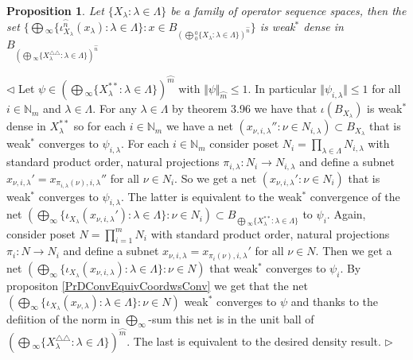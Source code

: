 \documentclass[12pt]{article}
\newtheorem{proposition}[theorem]{Proposition}
\newenvironment{proof}{\par $\triangleleft$}{$\triangleright$}
\begin{document}
\begin{proposition}\label{PrDensSubsetOfSumOfDoubleDuals} Let $\{X_\lambda:\lambda\in\Lambda\}$ be a family of operator sequence spaces, then the set $\{\bigoplus{}_\infty\{\iota_{X_\lambda}^{\wideparen{n}}(x_\lambda):\lambda\in \Lambda\}:x\in B_{(\bigoplus{}_0^0\{X_\lambda:\lambda\in \Lambda\})^{\wideparen{n}}}\}$ is weak${}^*$ dense in $B_{(\bigoplus{}_\infty\{X_\lambda^{\triangle\triangle}:\lambda\in \Lambda\})^{\wideparen{n}}}$
\end{proposition}
\begin{proof}
Let $\psi\in (\bigoplus{}_\infty\{X_\lambda^{**}:\lambda\in \Lambda\})^{\wideparen{m}}$ with $\Vert\psi\Vert_{\wideparen{m}}\leq 1$. In particular $\Vert\psi_{i,\lambda}\Vert\leq 1$ for all $i\in\mathbb{N}_m$ and $\lambda\in\Lambda$. For any $\lambda\in\Lambda$ by theorem 3.96 \cite{FabZizBanSpTh} we have that $\iota(B_{X_\lambda})$ is weak${}^*$ dense in $X_\lambda^{**}$ so for each $i\in\mathbb{N}_m$ we have a net $(x_{\nu,i,\lambda}'':\nu\in N_{i,\lambda})\subset B_{X_\lambda}$ that is weak${}^*$ converges to $\psi_{i,\lambda}$. For each $i\in\mathbb{N}_m$ consider poset $N_i=\prod_{\lambda\in\Lambda}N_{i,\lambda}$ with standard product order, natural projections $\pi_{i,\lambda}:N_i\to N_{i,\lambda}$ and define a subnet $x_{\nu,i,\lambda}'=x_{\pi_{i,\lambda}(\nu),i,\lambda}''$ for all $\nu\in N_i$. So we get a net $(x_{\nu,i,\lambda}':\nu\in N_i)$ that is weak${}^*$ converges to $\psi_{i,\lambda}$. The latter is equivalent to the weak${}^*$ convergence of the net $(\bigoplus_\infty\{\iota_{X_\lambda}(x_{\nu,i,\lambda}'):\lambda\in\Lambda\}:\nu\in N_i)\subset B_{\bigoplus{}_\infty\{X_\lambda^{**}:\lambda\in \Lambda\}}$ to $\psi_i$. Again, consider poset $N=\prod_{i=1}^m N_i$ with standard product order, natural projections $\pi_i:N\to N_i$ and define a subnet $x_{\nu,i,\lambda}=x_{\pi_i(\nu),i,\lambda}'$ for all $\nu\in N$. Then we get a net $(\bigoplus_\infty\{\iota_{X_\lambda}(x_{\nu,i,\lambda}):\lambda\in\Lambda\}:\nu\in N)$ that weak${}^*$ converges to $\psi_i$. By propositon \ref{PrDConvEquivCoordwsConv} we get that the net $(\bigoplus_\infty\{\iota_{X_\lambda}(x_{\nu,\lambda}):\lambda\in\Lambda\}:\nu\in N)$ weak${}^*$ converges to $\psi$ and thanks to  the defiition of the norm in $\bigoplus_\infty$-sum this net is in the unit ball of $(\bigoplus{}_\infty\{X_\lambda^{\triangle\triangle}:\lambda\in \Lambda\})^{\wideparen{m}}$. The last is equivalent to the desired density result. 
\end{proof}
\end{document}
